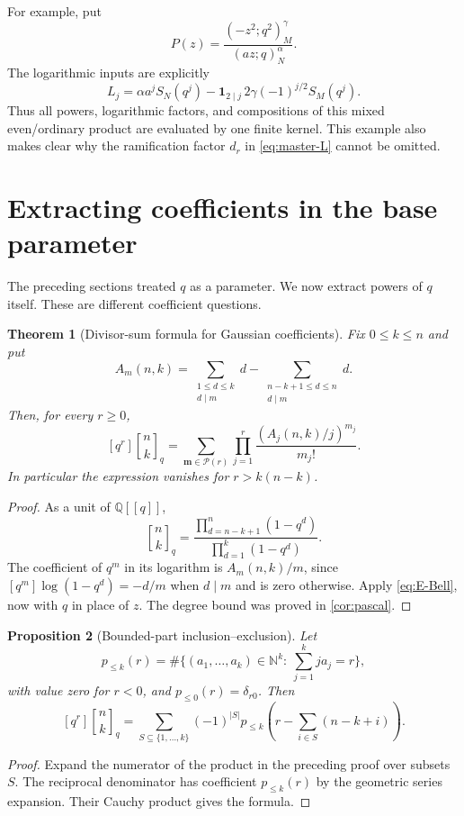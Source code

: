 \documentclass[11pt,a4paper]{article}
\numberwithin{equation}{section}
\newtheorem{theorem}{Theorem}[section]
\newtheorem{proposition}[theorem]{Proposition}
\theoremstyle{definition}
\theoremstyle{remark}
\newcommand{\Q}{\mathbb Q}
\newcommand{\N}{\mathbb N}
\newcommand{\qb}[2]{\genfrac{[}{]}{0pt}{}{#1}{#2}_{q}}
\newcommand{\poch}[3]{(#1;#2)_{#3}}
\newcommand{\Pcal}{\mathcal P}
\begin{document}
For example, put
\[
 P(z)=\frac{\poch{-z^2}{q^2}M^\gamma}{\poch{az}qN^\alpha}.
\]
The logarithmic inputs are explicitly
\begin{equation}\label{eq:mixed-example-L}
 L_j=\alpha a^jS_N(q^j)
   -\mathbf1_{2\mid j}\,2\gamma(-1)^{j/2}S_M(q^j).
\end{equation}
Thus all powers, logarithmic factors, and compositions of this mixed even/ordinary
product are evaluated by one finite kernel. This example also makes clear why the
ramification factor $d_r$ in \eqref{eq:master-L} cannot be omitted.

\section{Extracting coefficients in the base parameter}\label{sec:qcoeff}
The preceding sections treated $q$ as a parameter. We now extract powers of $q$
itself. These are different coefficient questions.

\begin{theorem}[Divisor-sum formula for Gaussian coefficients]\label{thm:qcoeff}
Fix $0\le k\le n$ and put
\begin{equation}\label{eq:divisor-L}
 A_m(n,k)=\sum_{\substack{1\le d\le k\\d\mid m}}d
          -\sum_{\substack{n-k+1\le d\le n\\d\mid m}}d.
\end{equation}
Then, for every $r\ge0$,
\begin{equation}\label{eq:qcoeff-Bell}
 [q^r]\qb nk
 =\sum_{\bm m\in\Pcal(r)}\prod_{j=1}^r
                 \frac{(A_j(n,k)/j)^{m_j}}{m_j!}.
\end{equation}
In particular the expression vanishes for $r>k(n-k)$.
\end{theorem}
\begin{proof}
As a unit of $\Q[[q]]$,
\[
 \qb nk=\frac{\prod_{d=n-k+1}^n(1-q^d)}{\prod_{d=1}^k(1-q^d)}.
\]
The coefficient of $q^m$ in its logarithm is $A_m(n,k)/m$, since
$[q^m]\log(1-q^d)=-d/m$ when $d\mid m$ and is zero otherwise.
Apply \eqref{eq:E-Bell}, now with $q$ in place of $z$. The degree bound was
proved in \cref{cor:pascal}.
\end{proof}

\begin{proposition}[Bounded-part inclusion--exclusion]\label{prop:restricted}
Let
\[
 p_{\le k}(r)=\#\{(a_1,\ldots,a_k)\in\N^k:\ \sum_{j=1}^k ja_j=r\},
\]
with value zero for $r<0$, and $p_{\le0}(r)=\delta_{r0}$. Then
\begin{equation}\label{eq:qcoeff-inclusion}
 [q^r]\qb nk=
 \sum_{S\subseteq\{1,\ldots,k\}}(-1)^{|S|}
 p_{\le k}\!\left(r-\sum_{i\in S}(n-k+i)\right).
\end{equation}
\end{proposition}
\begin{proof}
Expand the numerator of the product in the preceding proof over subsets $S$.
The reciprocal denominator has coefficient $p_{\le k}(r)$ by the geometric
series expansion. Their Cauchy product gives the formula.
\end{proof}
\end{document}
